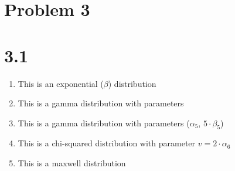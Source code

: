 \documentclass{article}
\begin{document}
\section*{Problem 3}
\section*{3.1}
\begin{enumerate}
\item This is an exponential ($\beta$) distribution \\
\item This is a gamma distribution with parameters \\
\item This is a gamma distribution with parameters ($\alpha_5$, $5 \cdot \beta_5$) \\
\item This is a chi-squared distribution with parameter $v = 2 \cdot \alpha_6$ \\
\item This is a maxwell distribution \\
\end{enumerate}
\end{document}
